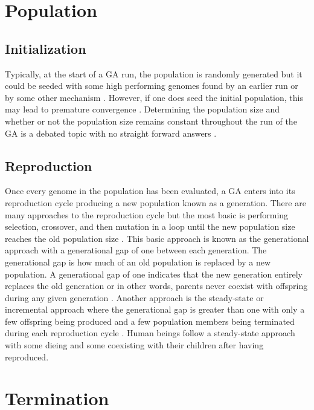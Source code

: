 \section{Population}

\subsection{Initialization}

Typically, at the start of a GA run, the population is randomly generated but it could be seeded with some high performing genomes found by an earlier run or by some other mechanism \cite{DBLP:conf/gem/Diaz-GomezH07}\cite{ColinReeves}. However, if one does seed the initial population, this may lead to premature convergence \cite{ColinReeves}. Determining the population size and whether or not the population size remains constant throughout the run of the GA is a debated topic with no straight forward answers \cite{ColinReeves}.     

\subsection{Reproduction}

Once every genome in the population has been evaluated, a GA enters into its reproduction cycle producing a new population known as a generation. There are many approaches to the reproduction cycle but the most basic is performing selection, crossover, and then mutation in a loop until the new population size reaches the old population size \cite{Beasley93anoverview}. This basic approach is known as the generational approach with a generational gap of one between each generation. The generational gap is how much of an old population is replaced by a new population. A generational gap of one indicates that the new generation entirely replaces the old generation or in other words, parents never coexist with offspring during any given generation \cite{Beasley93anoverview}. Another approach is the steady-state or incremental approach where the generational gap is greater than one with only a few offspring being produced and a few population members being terminated during each reproduction cycle \cite{ColinReeves}. Human beings follow a steady-state approach with some dieing and some coexisting with their children after having reproduced.       

\section{Termination}

